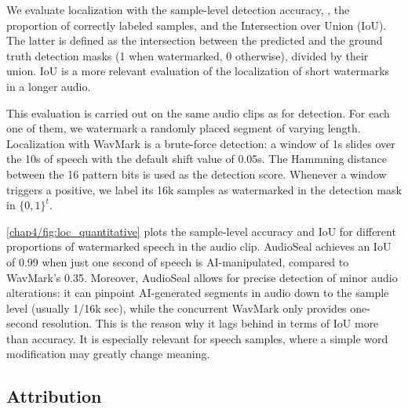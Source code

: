 We evaluate localization with the sample-level detection accuracy, \ie, the proportion of correctly labeled samples, and the Intersection over Union (IoU).
The latter is defined as the intersection between the predicted and the ground truth detection masks (1 when watermarked, 0 otherwise), divided by their union.
IoU is a more relevant evaluation of the localization of short watermarks in a longer audio.

This evaluation is carried out on the same audio clips as for detection.
For each one of them, we watermark a randomly placed segment of varying length.
Localization with WavMark is a brute-force detection: a window of 1s slides over the 10s of speech with the default shift value of 0.05s.
The Hammning distance between the 16 pattern bits is used as the detection score.
Whenever a window triggers a positive, we label its 16k samples as watermarked in the detection mask in $\{0,1\}^t$.

\autoref{chap4/fig:loc_quantitative} plots the sample-level accuracy and IoU for different proportions of watermarked speech in the audio clip.
AudioSeal achieves an IoU of 0.99 when just one second of speech is AI-manipulated, compared to WavMark's 0.35.
Moreover, AudioSeal allows for precise detection of minor audio alterations: it can pinpoint AI-generated segments in audio down to the sample level (usually 1/16k sec), while the concurrent WavMark only provides one-second resolution.
This is the reason why it lags behind in terms of IoU more than accuracy.
It is especially relevant for speech samples, where a simple word modification may greatly change meaning. 





\subsection{Attribution}

